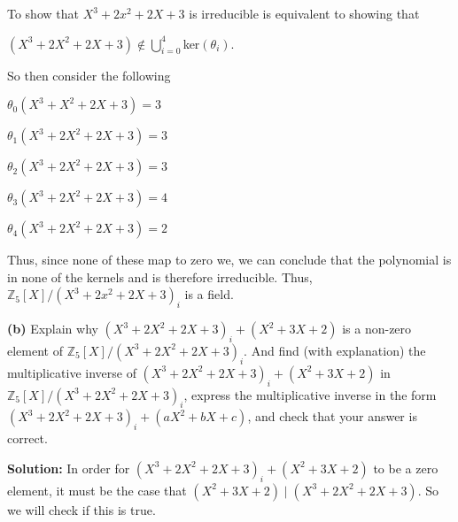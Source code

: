 \documentclass[12pt, a4paper]{article}
\begin{document}
\vspace{4mm}

To show that $X^3+2x^2+2X+3$ is irreducible is equivalent to showing that

\vspace{4mm}

\centerline{$(X^3+2X^2+2X+3)\notin\bigcup\limits_{i=0}^{4}$ker$(\theta_i)$.}

\vspace{4mm}

So then consider the following

\vspace{4mm}

\centerline{$\theta_0(X^3+X^2+2X+3)=3$}

\vspace{2mm}

\centerline{$\theta_1(X^3+2X^2+2X+3)=3$}

\vspace{2mm}

\centerline{$\theta_2(X^3+2X^2+2X+3)=3$}

\vspace{2mm}

\centerline{$\theta_3(X^3+2X^2+2X+3)=4$}

\vspace{2mm}

\centerline{$\theta_4(X^3+2X^2+2X+3)=2$}

\vspace{4mm}

Thus, since none of these map to zero we, we can conclude that the polynomial is in none of the kernels and is therefore irreducible. Thus, $\mathbb{Z}_5[X]/(X^3+2x^2+2X+3)_i$ is a field.

\vspace{6mm}\par

\textbf{(b)} Explain why $(X^3+2X^2+2X+3)_i+(X^2+3X+2)$ is a non-zero element of $\mathbb{Z}_5[X]/(X^3+2X^2+2X+3)_i$. And find (with explanation) the multiplicative inverse of $(X^3+2X^2+2X+3)_i+(X^2+3X+2)$ in $\mathbb{Z}_5[X]/(X^3+2X^2+2X+3)_i$, express the multiplicative inverse in the form $(X^3+2X^2+2X+3)_i+(aX^2+bX+c)$, and check that your answer is correct. 

\vspace{4mm}

\noindent\textbf{Solution:} In order for $(X^3+2X^2+2X+3)_i+(X^2+3X+2)$ to be a zero element, it must be the case that $(X^2+3X+2)\mid(X^3+2X^2+2X+3)$. So we will check if this is true.
\end{document}
